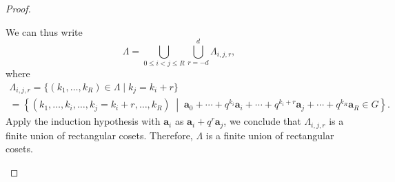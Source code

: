 \documentclass[letterpaper, 11pt, thm-restate]{article}
\numberwithin{equation}{section}
\newcommand{\ba}{\boldsymbol{a}}
\theoremstyle{definition}
\theoremstyle{definition}
\theoremstyle{definition}
\begin{document}
\begin{proof}
\begin{enumerate}[wide, label = \textbf{Case~\arabic*:}]
    We can thus write
    \[
    \Lambda = \bigcup_{0 \leq i < j \leq R} \bigcup_{r = -d}^d \Lambda_{i, j, r},
    \]
    where
    \begin{multline*}
    \Lambda_{i, j, r} 
    = \{(k_1, \ldots, k_R) \in \Lambda \mid k_j = k_i + r \} \\
    = \left\{ (k_1, \ldots, k_i, \ldots, k_j = k_i + r, \ldots,  k_R) \;\middle|\; \ba_0 + \cdots + q^{k_i} \ba_i + \cdots + q^{k_i+r} \ba_j + \cdots + q^{k_R} \ba_R \in G \right\}.
    \end{multline*}
    Apply the induction hypothesis with $\ba_i$ as $\ba_i + q^r \ba_j$, we conclude that $\Lambda_{i, j, r}$ is a finite union of rectangular cosets.
    Therefore, $\Lambda$ is a finite union of rectangular cosets.
    \end{enumerate}
\end{proof}
\end{document}
